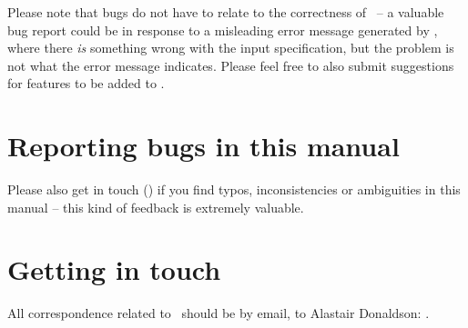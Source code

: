 Please note that bugs do not have to relate to the correctness of
\topspin\ -- a valuable bug report could be in response to a
misleading error message generated by \topspin, where there
\emph{is} something wrong with the input specification, but the
problem is not what the error message indicates.  Please feel free
to also submit suggestions for features to be added to \topspin.

\section{Reporting bugs in this manual}

Please also get in touch ()
if you find typos, inconsistencies or ambiguities in this manual --
this kind of feedback is extremely valuable.

\section{Getting in touch}\label{sec:troubleshooting:gettingintouch}

All correspondence related to \topspin\ should be by email, to
Alastair Donaldson: .
